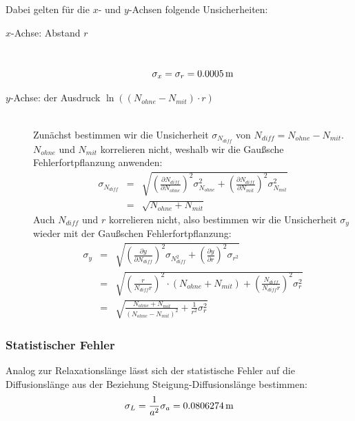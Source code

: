 \documentclass[a4paper,titlepage]{scrartcl}
\numberwithin{equation}{section}
\begin{document}
Dabei gelten für die $x$- und $y$-Achsen folgende Unsicherheiten:
\begin{description}
\item[$x$-Achse: Abstand $r$] \hfill \\
\begin{equation*}
\sigma_x=\sigma_r= \unit[0.0005]{m}
\end{equation*}
\item[$y$-Achse: der Ausdruck $\ln{((N_{ohne}-N_{mit}) \cdot r)}$] \hfill \\ Zunächst bestimmen wir die Unsicherheit $\sigma_{N_{diff}}$ von $N_{diff}=N_{ohne}-N_{mit}$. $N_{ohne}$ und $N_{mit}$ korrelieren nicht, weshalb wir die Gaußsche Fehlerfortpflanzung anwenden:
\begin{eqnarray*}
\sigma_{N_{diff}}&=&\sqrt{\left(\frac{\partial N_{diff}}{\partial N_{ohne}}\right)^2 \sigma^2_{N_{ohne}}+\left(\frac{\partial N_{diff}}{\partial N_{mit}}\right)^2 \sigma^2_{N_{mit}}}\\
&=&\sqrt{N_{ohne}+N_{mit}}
\end{eqnarray*}
Auch $N_{diff}$ und $r$ korrelieren nicht, also bestimmen wir die Unsicherheit $\sigma_y$ wieder mit der Gaußschen Fehlerfortpflanzung:
\begin{eqnarray*}
\sigma_y&=&\sqrt{\left( \frac{\partial y}{\partial N_{diff}} \right)^2 \sigma_{N^2_{diff}} + \left(\frac{\partial y}{\partial r}\right)^2 \sigma_{r^2}}\\
&=& \sqrt{ \left( \frac{r}{N_{diff}r}\right)^2 \cdot (N_{ohne}+N_{mit}) + \left(\frac{N_{diff}}{N_{diff} r}\right)^2 \sigma_r^2}\\
&=&\sqrt{\frac{N_{ohne}+N_{mit}}{(N_{ohne}-N_{mit})^2}+\frac{1}{r^2} \sigma_r^2}
\end{eqnarray*}
\end{description}
\subsubsection{Statistischer Fehler}
Analog zur Relaxationslänge lässt sich der statistische Fehler auf die Diffusionslänge aus der Beziehung Steigung-Diffusionslänge bestimmen:
\begin{equation*}
\sigma_L=\frac{1}{a^2}\sigma_a=\unit[0.0806274]{m}
\end{equation*}
\end{document}
